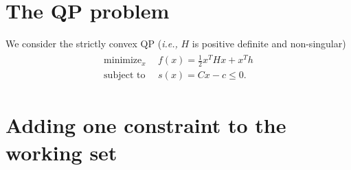 \documentclass[12pt,a4paper]{article}
\newcommand{\minimize}[1]{\mathop{\mbox{minimize}}_{#1} \ \ }
\newcommand{\st}[0]{\mbox{subject to} \ \ }
\begin{document}
\section{The QP problem}

We consider the strictly convex QP (\emph{i.e.,} $H$ is positive definite and
non-singular)
%
\begin{align} \label{eq.QP_ineq}
  \begin{split}
    \minimize{x} & f(x) = \frac{1}{2}x^THx + x^Th \\
    \st          & s(x) = Cx -c \leq 0.
  \end{split}
\end{align}

\section{Adding one constraint to the working set}
\end{document}
